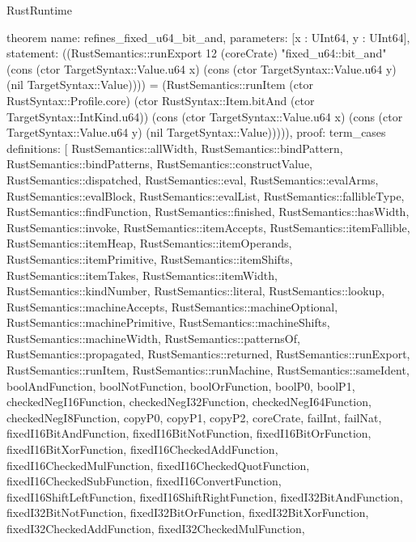 \begin{lexlean}{RustRuntime}
\begin{semanticmodule}
theorem{
  name: refines_fixed_u64_bit_and,
  parameters: [x : UInt64, y : UInt64],
  statement: ((RustSemantics::runExport 12 (coreCrate) "fixed_u64::bit_and" (cons (ctor TargetSyntax::Value.u64 x) (cons (ctor TargetSyntax::Value.u64 y) (nil TargetSyntax::Value)))) = (RustSemantics::runItem (ctor RustSyntax::Profile.core) (ctor RustSyntax::Item.bitAnd (ctor TargetSyntax::IntKind.u64)) (cons (ctor TargetSyntax::Value.u64 x) (cons (ctor TargetSyntax::Value.u64 y) (nil TargetSyntax::Value))))),
  proof: term_cases{
    definitions: [
      RustSemantics::allWidth,
      RustSemantics::bindPattern,
      RustSemantics::bindPatterns,
      RustSemantics::constructValue,
      RustSemantics::dispatched,
      RustSemantics::eval,
      RustSemantics::evalArms,
      RustSemantics::evalBlock,
      RustSemantics::evalList,
      RustSemantics::fallibleType,
      RustSemantics::findFunction,
      RustSemantics::finished,
      RustSemantics::hasWidth,
      RustSemantics::invoke,
      RustSemantics::itemAccepts,
      RustSemantics::itemFallible,
      RustSemantics::itemHeap,
      RustSemantics::itemOperands,
      RustSemantics::itemPrimitive,
      RustSemantics::itemShifts,
      RustSemantics::itemTakes,
      RustSemantics::itemWidth,
      RustSemantics::kindNumber,
      RustSemantics::literal,
      RustSemantics::lookup,
      RustSemantics::machineAccepts,
      RustSemantics::machineOptional,
      RustSemantics::machinePrimitive,
      RustSemantics::machineShifts,
      RustSemantics::machineWidth,
      RustSemantics::patternsOf,
      RustSemantics::propagated,
      RustSemantics::returned,
      RustSemantics::runExport,
      RustSemantics::runItem,
      RustSemantics::runMachine,
      RustSemantics::sameIdent,
      boolAndFunction,
      boolNotFunction,
      boolOrFunction,
      boolP0,
      boolP1,
      checkedNegI16Function,
      checkedNegI32Function,
      checkedNegI64Function,
      checkedNegI8Function,
      copyP0,
      copyP1,
      copyP2,
      coreCrate,
      failInt,
      failNat,
      fixedI16BitAndFunction,
      fixedI16BitNotFunction,
      fixedI16BitOrFunction,
      fixedI16BitXorFunction,
      fixedI16CheckedAddFunction,
      fixedI16CheckedMulFunction,
      fixedI16CheckedQuotFunction,
      fixedI16CheckedSubFunction,
      fixedI16ConvertFunction,
      fixedI16ShiftLeftFunction,
      fixedI16ShiftRightFunction,
      fixedI32BitAndFunction,
      fixedI32BitNotFunction,
      fixedI32BitOrFunction,
      fixedI32BitXorFunction,
      fixedI32CheckedAddFunction,
      fixedI32CheckedMulFunction,
}}
\end{semanticmodule}
\end{lexlean}
